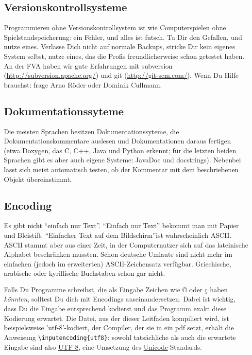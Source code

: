 \documentclass[twoside]{scrartcl}
\begin{document}
\subsection{Versionskontrollsysteme\label{sec:vcs}}
Programmieren ohne Versionskontrollsystem ist wie Computerspielen ohne 
Spielstandspeicherung: ein Fehler, und alles ist futsch.
Tu Dir den Gefallen, und nutze eines.
Verlasse Dich nicht auf normale Backups, stricke Dir kein eigenes System selbst,
nutze eines, das die Profis freundlicherweise schon getestet haben. 
An der FVA haben wir gute Erfahrungen mit 
subversion (\url{http://subversion.apache.org/})
und git (\url{http://git-scm.com/}).
Wenn Du Hilfe brauchst: frage Arno R\"o{}der oder Dominik Cullmann.  

\subsection{Dokumentationssyteme}
Die meisten Sprachen besitzen Dokumentationssyteme, die Dokumentationskommentare
auslesen und Dokumentationen daraus fertigen (etwa Doxygen, das C, C++, Java und
Python erkennt; f\"u{}r die letzten beiden Sprachen gibt es aber auch eigene
Systeme: JavaDoc und docstrings). 
Nebenbei l\"a{}sst sich meist automatisch testen, ob der
Kommentar mit dem beschriebenen Objekt \"u{}bereinstimmt. 

\subsection{Encoding}
Es gibt nicht "`einfach nur Text"'. "`Einfach nur Text"' bekommt man mit Papier 
und Bleistift. "`Einfacher Text auf dem Bildschirm"'ist wahrscheinlich
ASCII. ASCII stammt aber aus einer Zeit, in der Computernutzer sich auf das
lateinische Alphabet beschr\"a{}nken mussten. Schon deutsche Umlaute sind nicht
mehr im einfachen (jedoch im erweiterten) ASCII-Zeichensatz verf\"u{}gbar.
Griechische, arabische oder kyrillische Buchstaben schon gar nicht. 


Falls Du Programme schreibst, die als Eingabe Zeichen wie ©  oder ç haben
\emph{k\"o{}nnten}, solltest Du dich mit Encodings auseinandersetzen. Dabei 
ist wichtig, dass Du die Eingabe entsprechend kodierst und das Programm exakt
diese Kodierung erwartet. Die Datei, aus der dieser Leitfaden kompiliert
wird, ist beispielsweise 'utf-8'-kodiert, der Compiler, der sie in ein pdf 
setzt, erh\"a{}lt die Anweisung \verb+\inputencoding{utf8}+: sowohl 
tats\"a{}chliche als auch die erwartete Eingabe sind also 
\href{http://en.wikipedia.org/wiki/UTF-8}{UTF-8}, eine Umsetzung des
\href{http://en.wikipedia.org/wiki/Unicode}{Unicode}-Standards.
\end{document}
